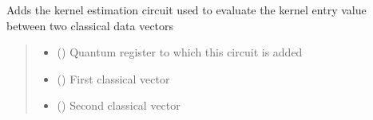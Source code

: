 \documentclass[letterpaper,10pt,english]{sphinxmanual}
\begin{document}
\begin{fulllineitems}
\begin{fulllineitems}
\label{\detokenize{qcompute_qapp.circuit:qcompute_qapp.circuit.KernelEstimationCircuit.add_circuit}}
\pysigstartsignatures
{}
\pysigstopsignatures
\sphinxAtStartPar
Adds the kernel estimation circuit used to evaluate the kernel entry value between
two classical data vectors
\begin{quote}\begin{description}
\begin{itemize}
\item {} 
\sphinxAtStartPar
{} () \textendash{} Quantum register to which this circuit is added

\item {} 
\sphinxAtStartPar
{} () \textendash{} First classical vector

\item {} 
\sphinxAtStartPar
{} () \textendash{} Second classical vector

\end{itemize}

\end{description}\end{quote}

\end{fulllineitems}


\end{fulllineitems}

\end{document}
